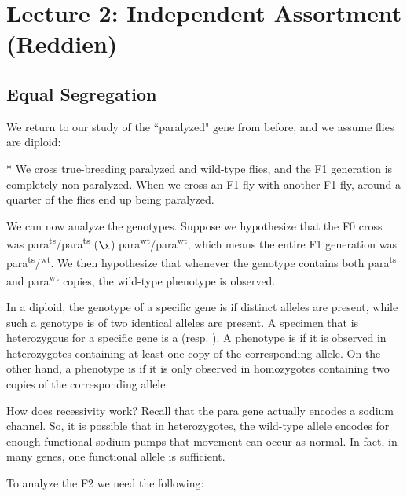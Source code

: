 \section*{Lecture 2: Independent Assortment (Reddien)}
\setcounter{section}{2}
\setcounter{defn}{0}
\setcounter{defncontainer}{0}
\setcounter{subsection}{0}

\subsection{Equal Segregation}

We return to our study of the ``paralyzed" gene from before, and we assume flies are diploid:

\begin{exper}*
	We cross true-breeding paralyzed and wild-type flies, and the F1 generation is completely non-paralyzed. When we cross an F1 fly with another F1 fly, around a quarter of the flies end up being paralyzed.
\end{exper}

We can now analyze the genotypes. Suppose we hypothesize that the F0 cross was para\textsuperscript{ts}/para\textsuperscript{ts} ($\x$) para\textsuperscript{wt}/para\textsuperscript{wt}, which means the entire F1 generation was para\textsuperscript{ts}/\textsuperscript{wt}. We then hypothesize that whenever the genotype contains both para\textsuperscript{ts} and para\textsuperscript{wt} copies, the wild-type phenotype is observed.

\begin{defn}
	In a diploid, the genotype of a specific gene is  if distinct alleles are present, while such a genotype is  of two identical alleles are present. A specimen that is heterozygous for a specific gene is a  (resp. ). A phenotype is  if it is observed in heterozygotes containing at least one copy of the corresponding allele. On the other hand, a phenotype is  if it is only observed in homozygotes containing two copies of the corresponding allele.
\end{defn}

How does recessivity work? Recall that the para gene actually encodes a sodium channel. So, it is possible that in heterozygotes, the wild-type allele encodes for enough functional sodium pumps that movement can occur as normal. In fact, in many genes, one functional allele is sufficient.

To analyze the F2 we need the following:

